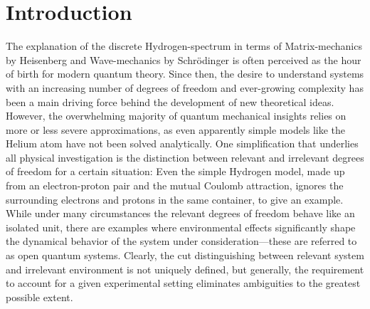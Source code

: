 \chapter{Introduction}
\label{chap:introduction}


The explanation of the discrete Hydrogen-spectrum in terms of Matrix-mechanics by Heisenberg and Wave-mechanics by Schrödinger is often perceived as the hour of birth for modern quantum theory.
Since then, the desire to understand systems with an increasing number of degrees of freedom and ever-growing complexity has been a main driving force behind the development of new theoretical ideas.
However, the overwhelming majority of quantum mechanical insights relies on more or less severe approximations, as even apparently simple models like the Helium atom have not been solved analytically.
One simplification that underlies all physical investigation is the distinction between relevant and irrelevant degrees of freedom for a certain situation:
Even the simple Hydrogen model, made up from an electron-proton pair and the mutual Coulomb attraction, ignores the surrounding electrons and protons in the same container, to give an example.
While under many circumstances the relevant degrees of freedom behave like an isolated unit, there are examples where environmental effects significantly shape the dynamical behavior of the system under consideration---these are referred to as open quantum systems.
Clearly, the cut distinguishing between relevant system and irrelevant environment is not uniquely defined, but generally, the requirement to account for a given experimental setting eliminates ambiguities to the greatest possible extent.


